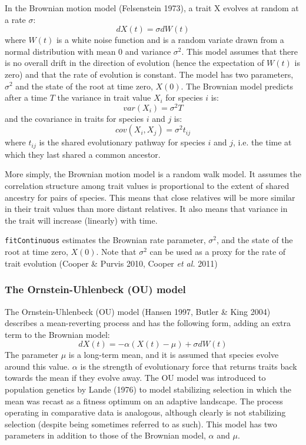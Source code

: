 \documentclass[11pt]{article}
\begin{document}
In the Brownian motion model (Felsenstein 1973), a trait X evolves at random at a rate $\sigma$:
\begin{equation}
dX(t) = \sigma dW(t)
\end{equation}
where $W(t)$ is a white noise function and is a random variate drawn from a normal distribution with mean $0$ and variance $\sigma^2$. This model assumes that there is no overall drift in the direction of evolution (hence the expectation of $W(t)$ is zero) and that the rate of evolution is constant. The model has two parameters, $\sigma^2$ and the state of the root at time zero, $X(0)$. The Brownian model predicts after a time $T$ the variance in trait value $X_i$ for species $i$ is:
\begin{equation}
var(X_i) = \sigma^2 T
\end{equation}
and the covariance in traits for species $i$ and $j$ is:
\begin{equation}
cov(X_i,X_j) = \sigma^2 t_{ij}
\end{equation}
where $t_{ij}$ is the shared evolutionary pathway for species $i$ and $j$, i.e. the time at which they last shared a common ancestor.  

More simply, the Brownian motion model is a random walk model. It assumes the correlation structure among trait values is proportional to the extent of shared ancestry for pairs of species. This means that close relatives will be more similar in their trait values than more distant relatives. It also means that variance in the trait will increase (linearly) with time. 

\texttt{fitContinuous} estimates the Brownian rate parameter, $\sigma^2$, and the state of the root at time zero, $X(0)$. Note that $\sigma^2$ can be used as a proxy for the rate of trait evolution (Cooper \& Purvis 2010, Cooper \textit{et al.} 2011)

\subsubsection{The Ornstein-Uhlenbeck (OU) model}
The Ornstein-Uhlenbeck (OU) model (Hansen 1997, Butler \& King 2004) describes a mean-reverting process and has the following form, adding an extra term to the Brownian model:
\begin{equation}
dX(t) = -\alpha(X(t) - \mu) + \sigma dW(t)
\end{equation}
The parameter $\mu$ is a long-term mean, and it is assumed that species evolve around this value. $\alpha$ is the strength of evolutionary force that returns traits back towards the mean if they evolve away. The OU model was introduced to population genetics by Lande (1976) to model stabilizing selection in which the mean was recast as a fitness optimum on an adaptive landscape. The process operating in comparative data is analogous, although clearly is not stabilizing selection (despite being sometimes referred to as such). This model has two parameters in addition to those of the Brownian model, $\alpha$ and $\mu$.\\
\end{document}
